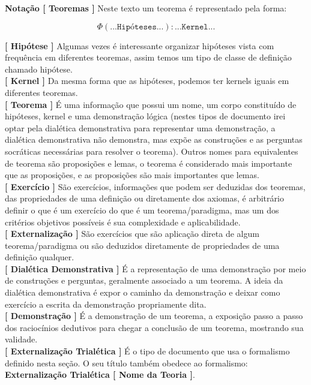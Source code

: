 \documentclass[10pt,a4paper]{report}
\begin{document}
\textbf{Notação [ Teoremas ]} Neste texto um teorema é representado pela forma:

$$\Phi(\texttt{...Hipóteses...}) : \texttt{...Kernel...}$$

\textbf{[ Hipótese ]} Algumas vezes é interessante organizar hipóteses vista com frequência em diferentes teoremas, assim temos um tipo de classe de definição chamado hipótese.\\

\textbf{[ Kernel ]} Da mesma forma que as hipóteses, podemos ter kernels iguais em diferentes teoremas.\\

\textbf{[ Teorema ]} É uma informação que possui um nome, um corpo constituído de hipóteses, kernel e uma demonstração lógica (nestes tipos de documento irei optar pela dialética demonstrativa para representar uma demonstração, a dialética demonstrativa não demonstra, mas expõe as construções e as perguntas socráticas necessárias para resolver o teorema). Outros nomes para equivalentes de teorema são proposições e lemas, o teorema é considerado mais importante que as proposições, e as proposições são mais importantes que lemas. \\

\textbf{[ Exercício ]} São exercícios, informações que podem ser deduzidas dos teoremas, das propriedades de uma definição ou diretamente dos axiomas, é arbitrário definir o que é um exercício do que é um teorema/paradigma, mas um dos critérios objetivos possíveis é sua complexidade e aplicabilidade.\\

\textbf{[ Externalização ]} São exercícios que são aplicação direta de algum teorema/paradigma ou são deduzidos diretamente de propriedades de uma definição qualquer.\\

\textbf{[ Dialética Demonstrativa ]} É a representação de uma demonstração por meio de construções e perguntas, geralmente associado a um teorema. A ideia da dialética demonstrativa é expor o caminho da demonstração e deixar como exercício a escrita da demonstração propriamente dita.  \\

\textbf{[ Demonstração ]} É a demonstração de um teorema, a exposição passo a passo dos raciocínios dedutivos para chegar a conclusão de um teorema, mostrando sua validade.\\

\textbf{[ Externalização Trialética ]} É o tipo de documento que usa o formalismo definido nesta seção. O seu título também obedece ao formalismo: \textbf{Externalização Trialética [ Nome da Teoria ]}.  \\
\end{document}
